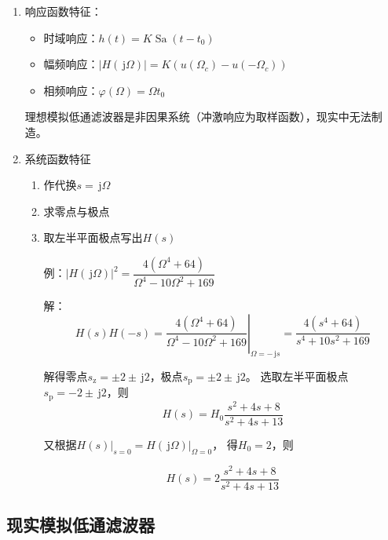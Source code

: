 \documentclass[UTF8,fontset=fandol,zihao=5]{ctexart}
\newcommand{\jj}{\,\mathrm{j}}
\newcommand{\Sa}{\operatorname{Sa}}
\begin{document}
\begin{enumerate}
  \item 响应函数特征：

  \begin{itemize}
    \item 时域响应：$h(t)=K\Sa(t-t_0)$
    \item 幅频响应：$\left|H(\jj\varOmega)\right|=K\left(u(\varOmega_c)-u(-\varOmega_c)\right)$
    \item 相频响应：$\varphi(\varOmega)=\varOmega t_0$
  \end{itemize}

\begin{methodbox}[【理解】理想模拟低通滤波器不存在]
  理想模拟低通滤波器是非因果系统（冲激响应为取样函数），现实中无法制造。
\end{methodbox}

  \item 系统函数特征

  \begin{methodbox}[【题型】由平方响应函数求系统函数]
    \begin{enumerate}[label=(\arabic*)]
      \item 作代换$s=\jj\varOmega$
      \item 求零点与极点
      \item 取左半平面极点写出$H(s)$
      
      例：$\left|H(\jj\varOmega)\right|^2=\dfrac{4(\varOmega^4+64)}{\varOmega^4-10\varOmega^2+169}$
      
      解：
      \[
      H(s)H(-s)=\left.\frac{4(\varOmega^4+64)}{\varOmega^4-10\varOmega^2+169}\right|_{\varOmega=-\jj s}=\frac{4(s^4+64)}{s^4+10s^2+169}
      \]
      
      解得零点$s_\text{z}=\pm2\pm\jj 2$，极点$s_\text{p}=\pm2\pm\jj 2$。
      选取左半平面极点$s_\text{p}=-2\pm\jj 2$，则
      \[
      H(s)=H_0\frac{s^2+4s+8}{s^2+4s+13}
      \]

      又根据$\left.H(s)\right|_{s=0}=\left.H(\jj\varOmega)\right|_{\varOmega=0}$，
      得$H_0=2$，则

      \[
      H(s)=2\frac{s^2+4s+8}{s^2+4s+13}
      \]
    \end{enumerate}
  \end{methodbox}
\end{enumerate}
\subsection{现实模拟低通滤波器}
\end{document}
